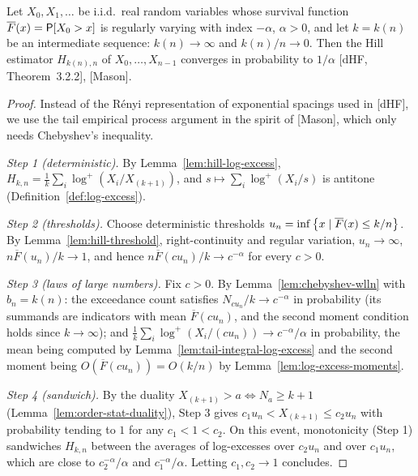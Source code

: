 \begin{theorem}
  \label{thm:hill-consistency}
  \leanok
  Let $X_0, X_1, \ldots$ be i.i.d.\ real random variables whose survival function
  $\overline{F}(x) = \mathsf{P}[X_0 > x]$ is regularly varying with index $-\alpha$, $\alpha > 0$, and let
  $k = k(n)$ be an intermediate sequence: $k(n) \to \infty$ and $k(n)/n \to 0$. Then the Hill
  estimator $H_{k(n),n}$ of $X_0, \ldots, X_{n-1}$ converges in probability to $1/\alpha$
  [dHF, Theorem~3.2.2], [Mason].
\end{theorem}
\begin{proof}
  \leanok
  Instead of the Rényi representation of exponential spacings used in [dHF], we use the tail
  empirical process argument in the spirit of [Mason], which only needs Chebyshev's inequality.

  \emph{Step 1 (deterministic).} By Lemma~\ref{lem:hill-log-excess},
  $H_{k,n} = \frac{1}{k} \sum_i \log^+(X_i / X_{(k+1)})$, and $s \mapsto \sum_i \log^+(X_i/s)$ is
  antitone (Definition~\ref{def:log-excess}).

  \emph{Step 2 (thresholds).} Choose deterministic thresholds
  $u_n = \inf \left\{  x \; | \; \overline{F}(x) \le k/n  \right\}$. By Lemma~\ref{lem:hill-threshold},
  right-continuity and regular variation, $u_n \to \infty$, $n \overline{F}(u_n)/k \to 1$, and
  hence $n \overline{F}(c u_n)/k \to c^{-\alpha}$ for every $c > 0$.

  \emph{Step 3 (laws of large numbers).} Fix $c > 0$. By Lemma~\ref{lem:chebyshev-wlln} with
  $b_n = k(n)$:
  the exceedance count satisfies $N_{c u_n}/k \to c^{-\alpha}$ in probability (its summands are
  indicators with mean $\overline{F}(c u_n)$, and the second moment condition holds since
  $k \to \infty$); and $\frac{1}{k} \sum_i \log^+(X_i/(c u_n)) \to c^{-\alpha}/\alpha$ in
  probability, the mean being computed by Lemma~\ref{lem:tail-integral-log-excess} and the second
  moment being $O(\overline{F}(c u_n)) = O(k/n)$ by Lemma~\ref{lem:log-excess-moments}.

  \emph{Step 4 (sandwich).} By the duality
  $X_{(k+1)} > a \iff N_a \ge k + 1$ (Lemma~\ref{lem:order-stat-duality}), Step 3 gives
  $c_1 u_n < X_{(k+1)} \le c_2 u_n$ with probability tending to $1$ for any $c_1 < 1 < c_2$. On
  this event, monotonicity (Step 1) sandwiches $H_{k,n}$ between the averages of log-excesses
  over $c_2 u_n$ and over $c_1 u_n$, which are close to $c_2^{-\alpha}/\alpha$ and
  $c_1^{-\alpha}/\alpha$. Letting $c_1, c_2 \to 1$ concludes.
\end{proof}

